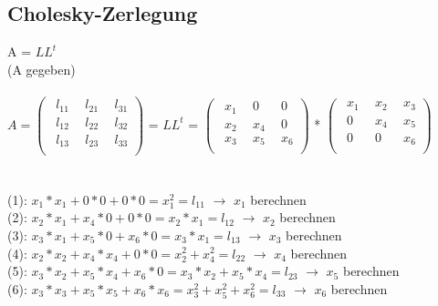 \subsection{Cholesky-Zerlegung}
	A = $LL^t$\\
	(A gegeben)\\\\ 
	$A=	\left(\begin{array}{ccc}
		\ \ l_{11} &\ \ l_{21} &\ \ l_{31}\\
		\ \ l_{12} &\ \ l_{22} &\ \ l_{32}\\
		\ \ l_{13} &\ \ l_{23} &\ \ l_{33}\\	
	\end{array}\right)$ 
	= $LL^t$ = 
	$\left(\begin{array}{ccc}
		\ \ x_1 &\ \ 0 &\ \ 0\\
		\ \ x_2 &\ \ x_4 &\ \ 0\\
		\ \ x_3 &\ \ x_5 &\ \ x_6\\	
	\end{array}\right)$ *
	$\left(\begin{array}{ccc}
		\ \ x_1 &\ \ x_2 &\ \ x_3\\
		\ \ 0 &\ \ x_4 &\ \ x_5\\
		\ \ 0 &\ \ 0 &\ \ x_6\\	
	\end{array}\right)$\\\\\\ 
	(1): $x_1*x_1 + 0*0 + 0*0 = x_1^2 = l_{11}$ $\rightarrow$ $x_1$ berechnen\\ 		
	(2): $x_2*x_1 + x_4*0 + 0*0 = x_2*x_1 = l_{12}$ $\rightarrow$ $x_2$ berechnen\\ 
	(3): $x_3*x_1 + x_5*0 + x_6*0 = x_3*x_1 = l_{13}$ $\rightarrow$ $x_3$ berechnen\\
	(4): $x_2*x_2 + x_4*x_4 + 0*0 = x_2^2 + x_4^2 = l_{22}$ $\rightarrow$ $x_4$ berechnen\\
	(5): $x_3*x_2 + x_5*x_4 + x_6*0 = x_3*x_2 + x_5*x_4 = l_{23}$ $\rightarrow$ $x_5$ berechnen\\	
	(6): $x_3*x_3 + x_5*x_5 + x_6*x_6 = x_3^2 + x_5^2 + x_6^2 = l_{33}$ $\rightarrow$ $x_6$ berechnen\\	







